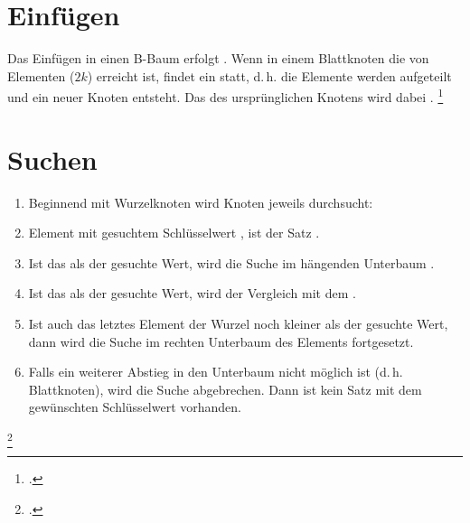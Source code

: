 \documentclass{lehramt-informatik}
\begin{document}
\section{Einfügen}

Das Einfügen in einen B-Baum erfolgt .
Wenn in einem Blattknoten die  von Elementen
($2k$) erreicht ist, findet ein  statt, d.\,h. die
Elemente werden aufgeteilt und ein neuer Knoten entsteht. Das
 des ursprünglichen Knotens wird dabei .
\footcite[Seite 32 (PDF 26)]{aud:fs:5}

%

\section{Suchen}

\begin{enumerate}
\item Beginnend mit Wurzelknoten wird Knoten jeweils  durchsucht:

\item {} Element mit gesuchtem Schlüsselwert
, ist der Satz .

\item Ist das  als der gesuchte Wert, wird die
Suche im  hängenden Unterbaum .

\item Ist das  als der gesuchte Wert, wird der
Vergleich mit dem .

\item Ist auch das letztes Element der Wurzel noch kleiner als der
gesuchte Wert, dann wird die Suche im rechten Unterbaum des Elements
fortgesetzt.

\item Falls ein weiterer Abstieg in den Unterbaum nicht möglich ist
(d.\,h. Blattknoten), wird die Suche abgebrechen. Dann ist kein Satz mit
dem gewünschten Schlüsselwert vorhanden.
\end{enumerate}

\footcite[Seite 37 (PDF 31)]{aud:fs:5}

%
\end{document}
